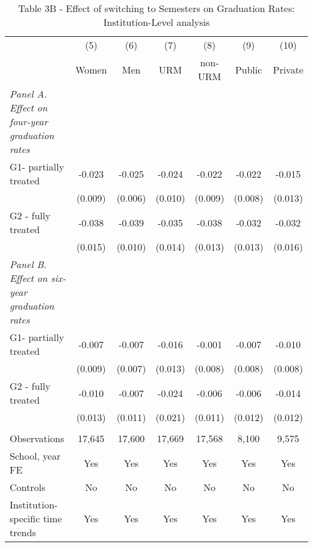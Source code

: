 \documentclass[8pt]{article}
\begin{document}
\begin{table}
\captionsetup{skip=0pt}
\captionsetup{font=footnotesize}
\caption*{Table 3B - Effect of switching to Semesters on Graduation Rates: Institution-Level analysis } 
\begin{tabular}{lcccccc} \hline
& (5) & (6) & (7) & (8) & (9) & (10) \\
& Women & Men & URM & non-URM & Public & Private \\ \hline
\textit{Panel A. Effect on four-year graduation rates}\\
G1- partially treated & -0.023 & -0.025 & -0.024 & -0.022 & -0.022 & -0.015 \\
& (0.009) & (0.006) & (0.010) & (0.009) & (0.008) & (0.013) \\
G2 - fully treated & -0.038 & -0.039 & -0.035 & -0.038 & -0.032 & -0.032 \\
& (0.015) & (0.010) & (0.014) & (0.013) & (0.013) & (0.016) \\
\textit{Panel B. Effect on six-year graduation rates}\\
G1- partially treated & -0.007 & -0.007 & -0.016 & -0.001 & -0.007 & -0.010 \\
 & (0.009) & (0.007) & (0.013) & (0.008) & (0.008) & (0.008) \\
G2 - fully treated & -0.010 & -0.007 & -0.024 & -0.006 & -0.006 & -0.014 \\
 & (0.013) & (0.011) & (0.021) & (0.011) & (0.012) & (0.012) \\
 &  &  &  &  &  &  \\
Observations & 17,645 & 17,600 & 17,669 & 17,568 & 8,100 & 9,575 \\
School, year FE & Yes & Yes & Yes & Yes & Yes & Yes \\
Controls & No & No & No & No & No & No \\
Institution-specific time trends & Yes & Yes & Yes & Yes & Yes & Yes \\ \hline
\end{tabular}
\end{table}
\end{document}
